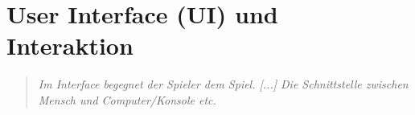 %
%


\chapter{User Interface (UI) und Interaktion}

\begin{quote}
\emph{\glqq Im Interface begegnet der Spieler dem Spiel. [...] Die Schnittstelle zwischen Mensch und Computer/Konsole etc.\grqq}~\cite[p.~161]{GameDesign} \\ %
\end{quote}

